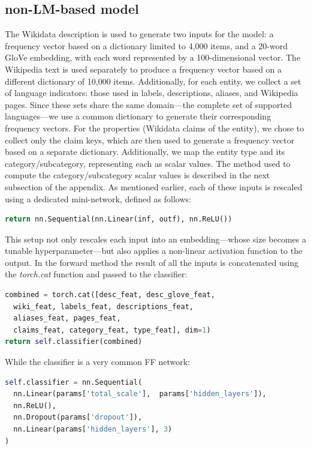 \documentclass[11pt]{article}
\begin{document}
\subsection{non-LM-based model}
The Wikidata description is used to generate two inputs for the model: a frequency vector based on a dictionary limited to 4,000 items, and a 20-word GloVe embedding, with each word represented by a 100-dimensional vector. The Wikipedia text is used separately to produce a frequency vector based on a different dictionary of 10,000 items. Additionally, for each entity, we collect a set of language indicators: those used in labels, descriptions, aliases, and Wikipedia pages. Since these sets share the same domain—the complete set of supported languages—we use a common dictionary to generate their corresponding frequency vectors. \newline For the properties (Wikidata claims of the entity), we chose to collect only the claim keys, which are then used to generate a frequency vector based on a separate dictionary. Additionally, we map the entity type and its category/subcategory, representing each as scalar values. The method used to compute the category/subcategory scalar values is described in the next subsection of the appendix. \newline As mentioned earlier, each of these inputs is rescaled using a dedicated mini-network, defined as follows:
\scriptsize
	\begin{lstlisting}[language=python]
return nn.Sequential(nn.Linear(inf, outf), nn.ReLU())
	\end{lstlisting}
\normalsize
This setup not only rescales each input into an embedding—whose size becomes a tunable hyperparameter—but also applies a non-linear activation function to the output. \newline In the forward method the result of all the inputs is concatenated using the \emph{torch.cat} function and passed to the classifier:
\scriptsize
	 \begin{lstlisting}[language=python]
combined = torch.cat([desc_feat, desc_glove_feat, 
  wiki_feat, labels_feat, descriptions_feat, 
  aliases_feat, pages_feat,
  claims_feat, category_feat, type_feat], dim=1)
return self.classifier(combined)
	 \end{lstlisting}
\normalsize
While the classifier is a very common FF network:
\scriptsize
    \begin{lstlisting}[language=python]
self.classifier = nn.Sequential(
  nn.Linear(params['total_scale'],  params['hidden_layers']),
  nn.ReLU(),
  nn.Dropout(params['dropout']),
  nn.Linear(params['hidden_layers'], 3)
)
    \end{lstlisting}
\normalsize
	 
\end{document}
